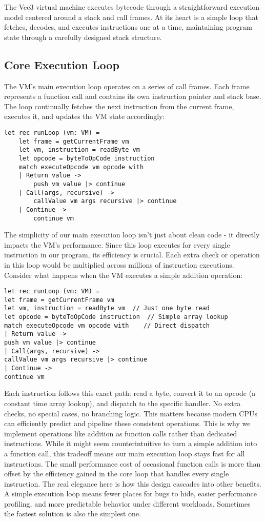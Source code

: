 The Vec3 virtual machine executes bytecode through a straightforward execution model centered around a stack and call frames. At its heart is a simple loop that fetches, decodes, and executes instructions one at a time, maintaining program state through a carefully designed stack structure.

\subsection{Core Execution Loop}

The VM's main execution loop operates on a series of call frames. Each frame represents a function call and contains its own instruction pointer and stack base. The loop continually fetches the next instruction from the current frame, executes it, and updates the VM state accordingly:

\begin{verbatim}
let rec runLoop (vm: VM) =
    let frame = getCurrentFrame vm
    let vm, instruction = readByte vm
    let opcode = byteToOpCode instruction
    match executeOpcode vm opcode with
    | Return value -> 
        push vm value |> continue
    | Call(args, recursive) ->
        callValue vm args recursive |> continue
    | Continue -> 
        continue vm
\end{verbatim}

The simplicity of our main execution loop isn't just about clean code - it directly impacts the VM's performance. Since this loop executes for every single instruction in our program, its efficiency is crucial. Each extra check or operation in this loop would be multiplied across millions of instruction executions.
Consider what happens when the VM executes a simple addition operation:
\begin{verbatim}
let rec runLoop (vm: VM) =
let frame = getCurrentFrame vm
let vm, instruction = readByte vm  // Just one byte read
let opcode = byteToOpCode instruction  // Simple array lookup
match executeOpcode vm opcode with    // Direct dispatch
| Return value ->
push vm value |> continue
| Call(args, recursive) ->
callValue vm args recursive |> continue
| Continue ->
continue vm
\end{verbatim}

Each instruction follows this exact path: read a byte, convert it to an opcode (a constant time array lookup), and dispatch to the specific handler. No extra checks, no special cases, no branching logic. This matters because modern CPUs can efficiently predict and pipeline these consistent operations.
This is why we implement operations like addition as function calls rather than dedicated instructions. While it might seem counterintuitive to turn a simple addition into a function call, this tradeoff means our main execution loop stays fast for all instructions. The small performance cost of occasional function calls is more than offset by the efficiency gained in the core loop that handles every single instruction.
The real elegance here is how this design cascades into other benefits. A simple execution loop means fewer places for bugs to hide, easier performance profiling, and more predictable behavior under different workloads. Sometimes the fastest solution is also the simplest one.

